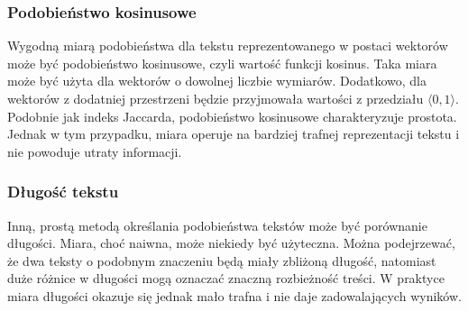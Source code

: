 \subsubsection{Podobieństwo kosinusowe}
Wygodną miarą podobieństwa dla tekstu reprezentowanego w postaci wektorów może być podobieństwo kosinusowe, czyli wartość funkcji kosinus. Taka miara może być użyta dla wektorów o dowolnej liczbie wymiarów. Dodatkowo, dla wektorów z dodatniej przestrzeni będzie przyjmowała wartości z przedziału $\langle 0,1 \rangle$.
Podobnie jak indeks Jaccarda, podobieństwo kosinusowe charakteryzuje prostota. Jednak w tym przypadku, miara operuje na bardziej trafnej reprezentacji tekstu i nie powoduje utraty informacji.

\subsubsection{Długość tekstu}
Inną, prostą metodą określania podobieństwa tekstów może być porównanie długości. Miara, choć naiwna, może niekiedy być użyteczna. Można podejrzewać, że dwa teksty o podobnym znaczeniu będą miały zbliżoną długość, natomiast duże różnice w długości mogą oznaczać znaczną rozbieżność treści. 
W praktyce miara długości okazuje się jednak mało trafna i nie daje zadowalających wyników. 



